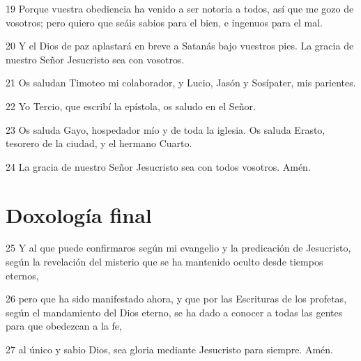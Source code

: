 \par 19 Porque vuestra obediencia ha venido a ser notoria a todos, así que me gozo de vosotros; pero quiero que seáis sabios para el bien, e ingenuos para el mal.
\par 20 Y el Dios de paz aplastará en breve a Satanás bajo vuestros pies. La gracia de nuestro Señor Jesucristo sea con vosotros.
\par 21 Os saludan Timoteo mi colaborador, y Lucio, Jasón y Sosípater, mis parientes.
\par 22 Yo Tercio, que escribí la epístola, os saludo en el Señor.
\par 23 Os saluda Gayo, hospedador mío y de toda la iglesia. Os saluda Erasto, tesorero de la ciudad, y el hermano Cuarto.
\par 24 La gracia de nuestro Señor Jesucristo sea con todos vosotros. Amén.

\section*{Doxología final}

\par 25 Y al que puede confirmaros según mi evangelio y la predicación de Jesucristo, según la revelación del misterio que se ha mantenido oculto desde tiempos eternos,
\par 26 pero que ha sido manifestado ahora, y que por las Escrituras de los profetas, según el mandamiento del Dios eterno, se ha dado a conocer a todas las gentes para que obedezcan a la fe,
\par 27 al único y sabio Dios, sea gloria mediante Jesucristo para siempre. Amén.


